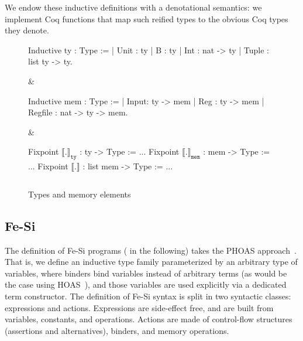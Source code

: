 \documentclass{llncs}
\newcommand{\denote}[1]{\llbracket #1 \rrbracket}
\newcommand{\denotety}[1]{\denote{\mathtt{#1}}_{\mathtt{ty}}}
\newcommand{\denotemem}[1]{\denote{\mathtt{#1}}_{\mathtt{mem}}}
\begin{document}
We endow these inductive definitions with a denotational semantics: we
implement Coq functions that map such reified types to the obvious Coq
types they denote.

\begin{figure}
  \centering
\begin{threelistings}
\begin{coq}
Inductive ty : Type :=
| Unit : ty 
| B : ty 
| Int : nat -> ty
| Tuple : list ty -> ty.     
\end{coq}&
\begin{coq}
Inductive mem : Type :=
| Input: ty ->  mem
| Reg : ty -> mem
| Regfile : nat -> ty -> mem. 
$ $
\end{coq}
&
\begin{coq}
Fixpoint $\denotety{.}$ : ty -> Type := ...
Fixpoint $\denotemem{.}$ : mem -> Type := ...
Fixpoint $\denote{.}$ : list mem -> Type := ...

$ $
\end{coq}
\end{threelistings}
\caption{Types and memory elements}
  \label{fig:type}
\end{figure}




\subsection{Fe-Si}
The definition of Fe-Si programs ( in the following)
takes the PHOAS approach~\cite{phoas-chlipala}. 
%
That is, we define an inductive type family parameterized by an
arbitrary type  of variables, where binders bind variables
instead of arbitrary terms (as would be the case using
HOAS~\cite{DBLP:conf/pldi/PfenningE88}), and those variables are used
explicitly via a dedicated term constructor.
%
The definition of Fe-Si syntax is split in two syntactic classes:
expressions and actions. 
%
Expressions are side-effect free, and are built from variables,
constants, and operations.
%
Actions are made of control-flow structures (assertions and
alternatives), binders, and memory operations. 
\end{document}
